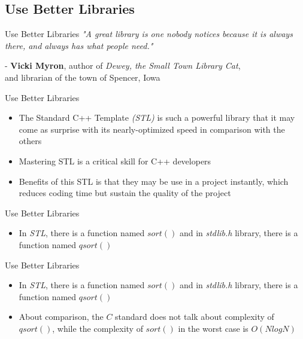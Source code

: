 \documentclass[aspectratio=169,xcolor=dvipsnames]{beamer}
\begin{document}
\subsection{Use Better Libraries}
\begin{frame}{Use Better Libraries}
    \textit{"A great library is one nobody notices because it is always there, and always has what
people need."}
    \begin{flushright}
        \small - \textbf{Vicki Myron}, author of \textit{Dewey, the Small Town Library Cat}, \\and librarian of the town of Spencer, Iowa
    \end{flushright}
\end{frame}
\begin{frame}{Use Better Libraries}
    \begin{itemize}
        \item The Standard C++ Template \textit{(STL)} is such a powerful library that it may come as surprise with its nearly-optimized speed in comparison with the others
        \item Mastering STL is a critical skill for C++ developers
        \item Benefits of this STL is that they may be use in a project instantly, which reduces coding time but sustain the quality of the project
    \end{itemize}
\end{frame}
\begin{frame}{Use Better Libraries}
    \begin{itemize}
        \item In \textit{STL}, there is a function named $sort()$ and in \textit{stdlib.h} library, there is a function named $qsort()$
    \end{itemize}
    
    
    
\end{frame}
\begin{frame}{Use Better Libraries}
    \begin{itemize}
        \item In \textit{STL}, there is a function named $sort()$ and in \textit{stdlib.h} library, there is a function named $qsort()$
        \item About comparison, the $C$  standard does not talk about complexity of $qsort()$, while the complexity of $sort()$ in the worst case is $O(NlogN)$
    \end{itemize}
\end{frame}
\end{document}
